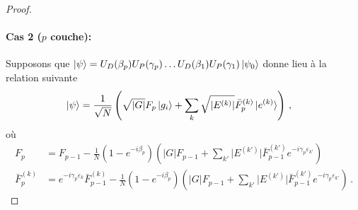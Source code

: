 \begin{proof}
\paragraph{Cas 2 ($p$ couche):} Supposons que $\ket{\psi} = U_{D}(\beta_{p}) U_{P}(\gamma_{p}) \dots U_{D}(\beta_{1})U_{P}(\gamma_{1})\ket{\psi_{0}}$ donne lieu à la relation suivante
\begin{equation}
\begin{aligned}
    \ket{\psi} &= \frac{1}{\sqrt{ N }} \left( \sqrt{ \lvert G \rvert } F_{p} \ket{g_{i}} + \sum_{k} \sqrt{ \lvert E^{(k)} \rvert } \bar{F}^{(k)}_{p} \ket{e^{(k)}} \right) \,,
\end{aligned}
\end{equation}
où
\begin{equation}
\begin{aligned}
    F_{p} &= F_{p-1} - \frac{1}{N} (1-e^{-i\beta_{p}}) \left( \lvert G \rvert   F_{p-1} + \sum_{k'} \lvert E^{(k')} \rvert \bar{F}^{(k')}_{p-1} e^{-i\gamma_{p}\varepsilon_{k'}} \right) \\
    \bar{F}^{(k)}_{p} &= e^{-i\gamma_{p} \varepsilon_{k}}\bar{F}_{p-1}^{(k)} - \frac{1}{N} (1-e^{-i\beta_{p}}) \left( \lvert G \rvert   F_{p-1} + \sum_{k'} \lvert E^{(k')} \rvert \bar{F}^{(k')}_{p-1} e^{-i\gamma_{p}\varepsilon_{k'}} \right) \,.
\end{aligned}
\end{equation}


\end{proof}

